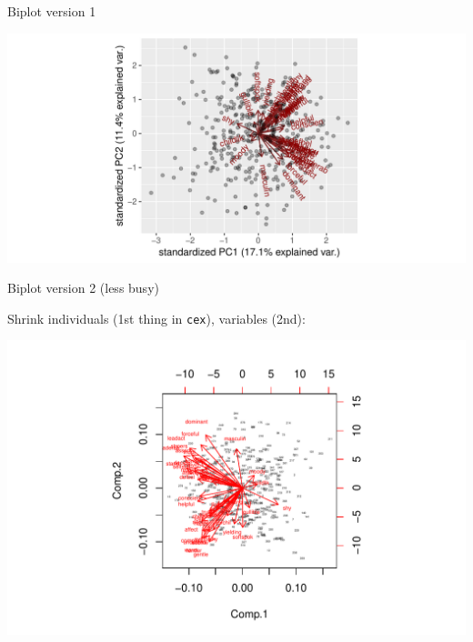 \begin{frame}[fragile]{Biplot version 1}

\begin{knitrout}
\color{fgcolor}\begin{kframe}
\begin{alltt}
\end{alltt}
\end{kframe}
\includegraphics[width=\maxwidth]{figure/bem-biplot-1} 

\end{knitrout}
  
\end{frame}

\begin{frame}{Biplot version 2 (less busy)}

Shrink individuals (1st thing in \texttt{cex}), variables (2nd):
\begin{knitrout}
\color{fgcolor}\begin{kframe}
\begin{alltt}
\hlstd{=}\hlstd{(}\hlstd{,}\hlstd{))}
\end{alltt}
\end{kframe}
\includegraphics[width=\maxwidth]{figure/bem-biplot-two-1} 

\end{knitrout}

  
\end{frame}

